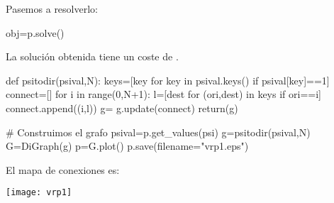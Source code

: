 \documentclass{article}
\begin{document}
Pasemos a resolverlo:

\begin{sageblock}
obj=p.solve()
\end{sageblock}

La solución obtenida tiene un coste de .


\begin{sagesilent}
def psitodir(psival,N):
 keys=[key for key in psival.keys() if psival[key]==1]
 connect=[]
 for i in range(0,N+1):
   l=[dest for (ori,dest) in keys if ori==i]
   connect.append((i,l))
 g={}
 g.update(connect)
 return(g)
\end{sagesilent}
  

\begin{sagesilent}
# Construimos el grafo
psival=p.get_values(psi)
g=psitodir(psival,N)
G=DiGraph(g)
p=G.plot()
p.save(filename="vrp1.eps")
\end{sagesilent}

El mapa de conexiones es:

\texttt{[image: vrp1]}
\end{document}
